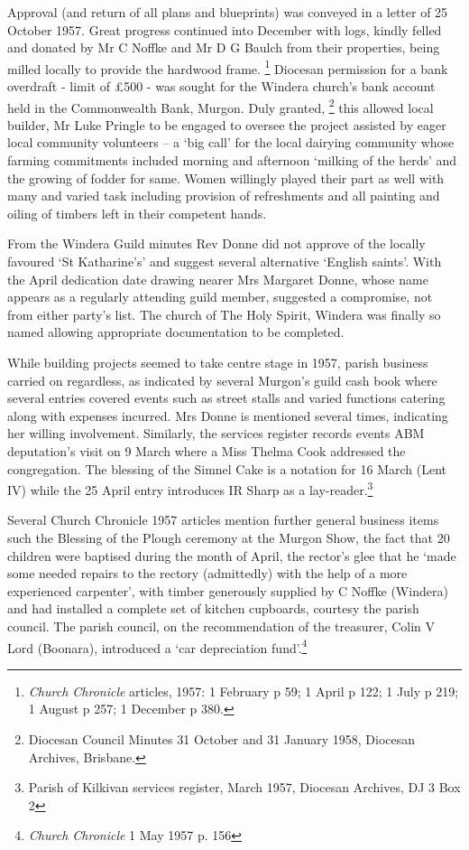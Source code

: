 Approval (and return of all plans and blueprints) was conveyed in a
letter of 25 October 1957. Great progress continued into December with
logs, kindly felled and donated by Mr C Noffke and Mr D G Baulch from
their properties, being milled locally to provide the hardwood frame.
\footnote{\emph{Church Chronicle} articles, 1957: 1 February p 59; 1
  April p 122; 1 July p 219; 1 August p 257; 1 December p 380.} Diocesan
permission for a bank overdraft - limit of £500 - was sought for the
Windera church's bank account held in the Commonwealth Bank, Murgon.
Duly granted, \footnote{Diocesan Council Minutes 31 October and 31
  January 1958, Diocesan Archives, Brisbane.} this allowed local
builder, Mr Luke Pringle to be engaged to oversee the project assisted
by eager local community volunteers -- a `big call' for the local
dairying community whose farming commitments included morning and
afternoon `milking of the herds' and the growing of fodder for same.
Women willingly played their part as well with many and varied task
including provision of refreshments and all painting and oiling of
timbers left in their competent hands.

From the Windera Guild minutes Rev Donne did not approve of the locally
favoured `St Katharine's' and suggest several alternative `English
saints'. With the April dedication date drawing nearer Mrs Margaret
Donne, whose name appears as a regularly attending guild member,
suggested a compromise, not from either party's list. The church of The
Holy Spirit, Windera was finally so named allowing appropriate
documentation to be completed.

While building projects seemed to take centre stage in 1957, parish
business carried on regardless, as indicated by several Murgon's guild
cash book where several entries covered events such as street stalls and
varied functions catering along with expenses incurred. Mrs Donne is
mentioned several times, indicating her willing involvement. Similarly,
the services register records events ABM deputation's visit on 9 March
where a Miss Thelma Cook addressed the congregation. The blessing of the
Simnel Cake is a notation for 16 March (Lent IV) while the 25 April
entry introduces IR Sharp as a lay-reader.\footnote{Parish of Kilkivan
  services register, March 1957, Diocesan Archives, DJ 3 Box 2}

Several Church Chronicle 1957 articles mention further general business
items such the Blessing of the Plough ceremony at the Murgon Show, the
fact that 20 children were baptised during the month of April, the
rector's glee that he `made some needed repairs to the rectory
(admittedly) with the help of a more experienced carpenter', with timber
generously supplied by C Noffke (Windera) and had installed a complete
set of kitchen cupboards, courtesy the parish council. The parish
council, on the recommendation of the treasurer, Colin V Lord (Boonara),
introduced a `car depreciation fund'.\footnote{\emph{Church Chronicle} 1
  May 1957 p. 156}

